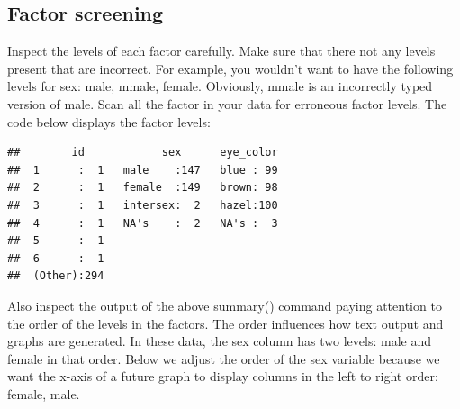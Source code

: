 \documentclass[
]{krantz}
\makeatletter
\newenvironment{Shaded}{\begin{snugshade}}{\end{snugshade}}
\newcommand{\DataTypeTok}[1]{\textcolor[rgb]{0.27,0.27,0.27}{#1}}
\newcommand{\KeywordTok}[1]{\textcolor[rgb]{0.27,0.27,0.27}{\textbf{#1}}}
\newcommand{\NormalTok}[1]{#1}
\newcommand{\OperatorTok}[1]{\textcolor[rgb]{0.43,0.43,0.43}{\textbf{#1}}}
\newcommand{\StringTok}[1]{\textcolor[rgb]{0.5,0.5,0.5}{#1}}
\newenvironment{kframe}{%
\medskip{}
\setlength{\fboxsep}{.8em}
 \def\at@end@of@kframe{}%
 \ifinner\ifhmode%
  \def\at@end@of@kframe{\end{minipage}}%
  \begin{minipage}{\columnwidth}%
 \fi\fi%
 \def\FrameCommand##1{\hskip\@totalleftmargin \hskip-\fboxsep
 \colorbox{shadecolor}{##1}\hskip-\fboxsep
     \hskip-\linewidth \hskip-\@totalleftmargin \hskip\columnwidth}%
 \MakeFramed {\advance\hsize-\width
   \@totalleftmargin\z@ \linewidth\hsize
   \@setminipage}}%
 {\par\unskip\endMakeFramed%
 \at@end@of@kframe}
\renewenvironment{Shaded}{\begin{kframe}}{\end{kframe}}
\makeatother
\begin{document}
\hypertarget{factor-screening-3}{%
\subsection{Factor screening}\label{factor-screening-3}}

Inspect the levels of each factor carefully. Make sure that there not any levels present that are incorrect. For example, you wouldn't want to have the following levels for sex: male, mmale, female. Obviously, mmale is an incorrectly typed version of male. Scan all the factor in your data for erroneous factor levels. The code below displays the factor levels:

\begin{Shaded}
\end{Shaded}

\begin{verbatim}
##        id            sex      eye_color  
##  1      :  1   male    :147   blue : 99  
##  2      :  1   female  :149   brown: 98  
##  3      :  1   intersex:  2   hazel:100  
##  4      :  1   NA's    :  2   NA's :  3  
##  5      :  1                             
##  6      :  1                             
##  (Other):294
\end{verbatim}

Also inspect the output of the above summary() command paying attention to the order of the levels in the factors. The order influences how text output and graphs are generated. In these data, the sex column has two levels: male and female in that order. Below we adjust the order of the sex variable because we want the x-axis of a future graph to display columns in the left to right order: female, male.

\begin{Shaded}
\end{Shaded}
\end{document}
